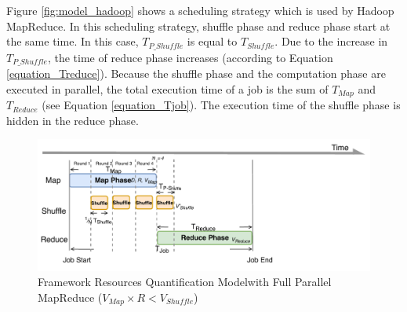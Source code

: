 {%

Figure \ref{fig:model_hadoop} shows a scheduling strategy which is used by Hadoop MapReduce. In this scheduling strategy, shuffle phase and reduce phase start at the same time. In this case, \(T_{P\_Shuffle}\) is equal to \(T_{Shuffle}\). Due to the increase in \(T_{P\_Shuffle}\), the time of reduce phase increases (according to Equation \ref{equation_Treduce}). Because the shuffle phase and the computation phase are executed in parallel, the total execution time of a job is the sum of \(T_{Map}\) and \(T_{Reduce}\) (see Equation \ref{equation_Tjob}). The execution time of the shuffle phase is hidden in the reduce phase. 

\begin{figure}
	\centering
	\includegraphics[width=\linewidth]{fig/model_scache2}
	\caption{\color{black}Framework Resources Quantification Model\newline with Full Parallel MapReduce (\(V_{Map} \times R < V_{Shuffle}\))}
	\label{fig:model_scache2}
\end{figure}

}
